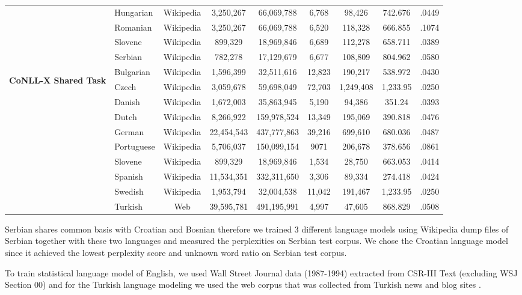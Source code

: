 \begin{table}[ht]
\begin{tabular}{@{ }l@{ }|@{ }l@{ }|@{ }c@{ }|@{ }c@{ }|@{ }c@{ }|c@{ }|@{ }c@{ }|@{ }c@{ }|@{ }c@{ }|}
    &Hungarian & Wikipedia &3,250,267& 66,069,788 & 6,768 & 98,426 & 742.676 & .0449\\
    &Romanian & Wikipedia &3,250,267&66,069,788  & 6,520 & 118,328 & 666.855 & .1074\\
    &Slovene & Wikipedia & 899,329&18,969,846 & 6,689 & 112,278 & 658.711 & .0389\\
    &Serbian & Wikipedia & 782,278 & 17,129,679 & 6,677 & 108,809 & 804.962 & .0580\\
    \hline %
    \multirow{10}{*}{\begin{sideways}\textbf{CoNLL-X Shared Task}\end{sideways}}
    &Bulgarian& Wikipedia &1,596,399 & 32,511,616  & 12,823 & 190,217 & 538.972 & .0430\\
    &Czech & Wikipedia &3,059,678 & 59,698,049 & 72,703 & 1,249,408 & 1,233.95 &.0250\\
    &Danish & Wikipedia &1,672,003 & 35,863,945 & 5,190 & 94,386 & 351.24 & .0393\\
    &Dutch & Wikipedia &8,266,922 & 159,978,524 & 13,349 & 195,069 & 390.818 & .0476\\
    &German & Wikipedia &22,454,543&437,777,863 & 39,216 & 699,610 & 680.036 & .0487\\
    &Portuguese & Wikipedia & 5,706,037 & 150,099,154 & 9071 & 206,678 & 378.656 & .0861\\
    &Slovene & Wikipedia & 899,329 & 18,969,846 & 1,534 & 28,750 & 663.053 & .0414\\
    &Spanish & Wikipedia &11,534,351 & 332,311,650& 3,306 & 89,334 & 274.418 & .0424\\
    &Swedish & Wikipedia &1,953,794 & 32,004,538& 11,042 & 191,467 & 1,233.95 & .0250\\
    &Turkish & Web &39,595,781 & 491,195,991& 4,997 & 47,605 & 868.829 & .0508\\
    \hline
  \end{tabular}
  \label{tab:lmstatistics}
\end{table}

Serbian shares common basis with Croatian and Bosnian therefore we
trained 3 different language models using Wikipedia dump files of
Serbian together with these two languages and measured the
perplexities on Serbian test corpus.  We chose the Croatian language
model since it achieved the lowest perplexity score and unknown word
ratio on Serbian test corpus.

To train statistical language model of English, we used Wall Street
Journal data (1987-1994) extracted from CSR-III Text \cite{csr3text}
(excluding WSJ Section 00) and for the Turkish language modeling we
used the web corpus that was collected from Turkish news and blog
sites \cite{sak2008turkish}.

